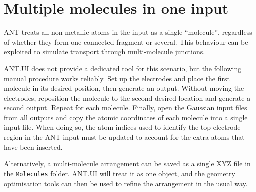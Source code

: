\documentclass[12pt]{article}
\begin{document}
\section{Multiple molecules in one input}

ANT treats all non-metallic atoms in the input as a single ``molecule'', regardless of whether they form one connected fragment or several. This behaviour can be exploited to simulate transport through multi-molecule junctions.

ANT.UI does not provide a dedicated tool for this scenario, but the following manual procedure works reliably. Set up the electrodes and place the first molecule in its desired position, then generate an output. Without moving the electrodes, reposition the molecule to the second desired location and generate a second output. Repeat for each molecule. Finally, open the Gaussian input files from all outputs and copy the atomic coordinates of each molecule into a single input file. When doing so, the atom indices used to identify the top-electrode region in the ANT input must be updated to account for the extra atoms that have been inserted.

Alternatively, a multi-molecule arrangement can be saved as a single XYZ file in the \texttt{Molecules} folder. ANT.UI will treat it as one object, and the geometry optimisation tools can then be used to refine the arrangement in the usual way.
\end{document}
